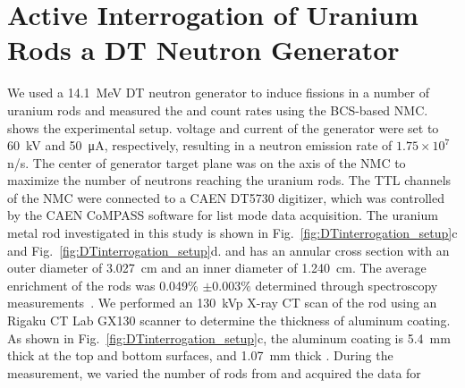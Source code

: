 \documentclass[preprint,final]{elsarticle}
\begin{document}
\section{Active Interrogation of Uranium Rods  a DT Neutron Generator}\label{sec:rod_interrogation}

We used a \SI{14.1}{\mega\eV} DT neutron generator to induce fissions in a number of uranium rods and measured the  and  count rates using the BCS-based NMC.  shows the experimental setup. voltage and current of the generator were set to \SI{60}{\kV} and \SI{50}{\micro\ampere}, respectively, resulting in a neutron emission rate of $1.75\times10^{7}$ n/s. The center of generator target plane was on the axis of the NMC to maximize the number of neutrons reaching the uranium rods. The TTL channels of the NMC were connected to a CAEN DT5730 digitizer, which was controlled by the CAEN CoMPASS software for list mode data acquisition. The uranium metal rod investigated in this study is shown in Fig.~\ref{fig:DTinterrogation_setup}c and Fig.~\ref{fig:DTinterrogation_setup}d.  and has an annular cross section with an outer diameter of \SI{3.027}{cm} and an inner diameter of \SI{1.240}{cm}.{ The average enrichment of the rods was 0.049\% $\pm 0.003\%$ determined through  spectroscopy measurements~\cite{reilly1991passive,borrell2009uranium,luca2008experimental}.} We performed an 130~kVp X-ray CT scan of the rod using an Rigaku CT Lab GX130 scanner to determine the thickness of aluminum coating. As shown in Fig.~\ref{fig:DTinterrogation_setup}c, the aluminum coating is \SI{5.4}{mm} thick at the top and bottom surfaces, and \SI{1.07}{mm} thick . During the measurement, we varied the number of rods from  and acquired the data for 
\end{document}
